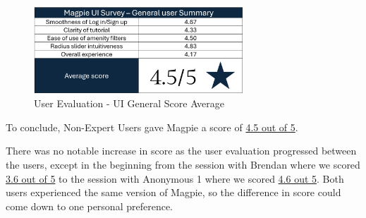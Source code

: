 \begin{figure}[h!]
    \centering
    \includegraphics[width=0.7\textwidth]{images/survey-casual-summary.png}
    \caption{User Evaluation - UI General Score Average}
\end{figure}

To conclude, Non-Expert Users gave Magpie a score of \underline{4.5 out of 5}.

There was no notable increase in score as the user evaluation progressed between
the users, except in the beginning from the session with Brendan where we scored
\underline{3.6 out of 5} to the session with Anonymous 1 where we scored
\underline{4.6 out 5}. Both users experienced the same version of Magpie, so the
difference in score could come down to one personal preference.